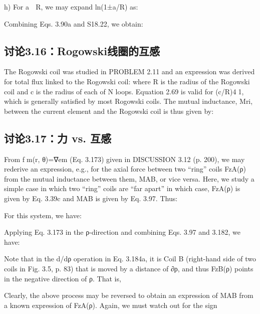 h) For a  R, we may expand ln(1±a/R) as:

Combining Eqs. 3.90a and S18.22, we obtain:

\newpage



\subsection{讨论3.16：Rogowski线圈的互感}
The Rogowski coil was studied in PROBLEM 2.11 and an expression was derived
for total flux linked to the Rogowski coil:
where R is the radius of the Rogowski coil and c is the radius of each of N loops.
Equation 2.69 is valid for (c/R)41, which is generally satisfied by most Rogowski
coils. The mutual inductance, Mri, between the current element and the Rogowski
coil is thus given by:

\newpage



\subsection{讨论3.17：力 vs. 互感}
From fm(r, θ)=∇em (Eq. 3.173) given in DISCUSSION 3.12 (p. 200), we may rederive an expression, e.g., for the axial force between two “ring” coils FzA(ρ) from
the mutual inductance between them, MAB, or vice versa. Here, we study a simple
case in which two “ring” coils are “far apart” in which case, FzA(ρ) is given by
Eq. 3.39c and MAB is given by Eq. 3.97. Thus:

For this system, we have:

Applying Eq. 3.173 in the ρ-direction and combining Eqs. 3.97 and 3.182, we have:

Note that in the d/dρ operation in Eq. 3.184a, it is Coil B (right-hand side of two
coils in Fig. 3.5, p. 83) that is moved by a distance of ∂ρ, and thus FzB(ρ) points
in the negative direction of ρ. That is,

Clearly, the above process may be reversed to obtain an expression of MAB from a
known expression of FzA(ρ). Again, we must watch out for the sign


